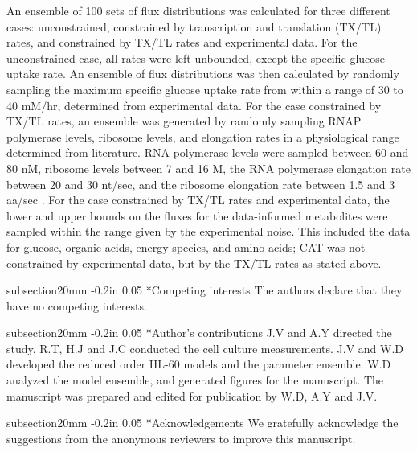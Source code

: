 \documentclass[12pt]{article}
\makeatletter
\renewcommand\section{\@startsection
	{subsection}{2}{0mm}
	{-0.2in}
	{0.05\baselineskip}
	{\normalfont\large\bfseries}}
\makeatother
\begin{document}
An ensemble of 100 sets of flux distributions was calculated for three different cases: unconstrained, constrained by transcription and translation (TX/TL) rates, and  constrained by TX/TL rates and experimental data.
For the unconstrained case, all rates were left unbounded, except the specific glucose uptake rate.
An ensemble of flux distributions was then calculated by randomly sampling the maximum specific glucose uptake rate from within a range of 30 to 40 mM/hr, determined from experimental data.
For the case constrained by TX/TL rates, an ensemble was generated by randomly sampling RNAP polymerase levels, ribosome levels, and elongation rates in a physiological range determined from literature.
RNA polymerase levels were sampled between 60 and 80 nM, ribosome levels between 7 and 16 \textmu M, the RNA polymerase elongation rate between 20 and 30 nt/sec, and the ribosome elongation rate between 1.5 and 3 aa/sec \cite{2005_underwood_biotech, Garamella:2016aa}.
For the case constrained by TX/TL rates and experimental data, the lower and upper bounds on the fluxes for the data-informed metabolites were sampled within the range given by the experimental noise.
This included the data for glucose, organic acids, energy species, and amino acids; CAT was not constrained by experimental data, but by the TX/TL rates as stated above.


\clearpage

\section*{Competing interests}
The authors declare that they have no competing interests.

\section*{Author's contributions}
J.V and A.Y directed the study. R.T, H.J and J.C conducted the cell culture measurements.
J.V and W.D developed the reduced order HL-60 models and the parameter ensemble.
W.D analyzed the model ensemble, and generated figures for the manuscript.
The manuscript was prepared and edited for publication by W.D, A.Y and J.V.

\section*{Acknowledgements}
We gratefully acknowledge the suggestions from the anonymous reviewers to improve this manuscript.
\end{document}

